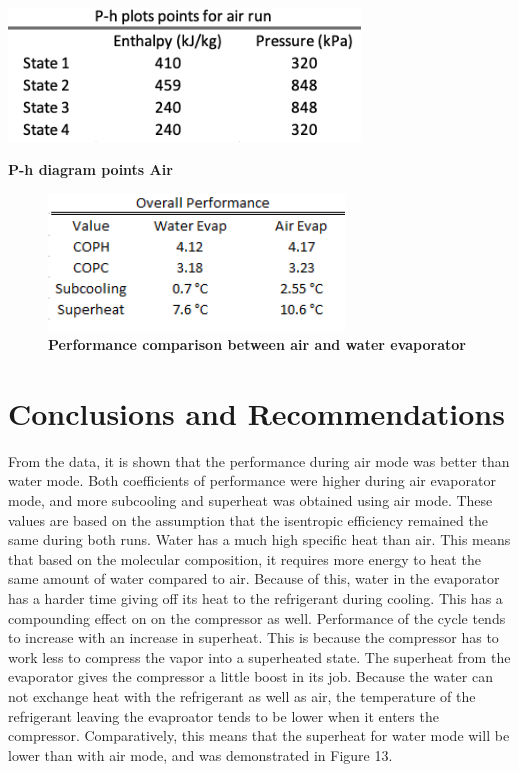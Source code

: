 \documentclass{article}
\begin{document}
\begin{table} [H]
	\centering
	\includegraphics[width=0.7\textwidth]{ph_points_air}
	\caption{\textbf{P-h diagram points Air}}
\end{table}


\begin{figure} [H]
	\centering
	\includegraphics[width=0.7\textwidth]{overall_perform}
	\caption{\textbf{Performance comparison between air and water evaporator}}
\end{figure}

\section {Conclusions and Recommendations}
From the data, it is shown that the performance during air mode was better than water mode. Both coefficients of performance were higher during air evaporator mode, and more subcooling and superheat was obtained using air mode. These values are based on the assumption that the isentropic efficiency remained the same during both runs. Water has a much high specific heat than air. This means that based on the molecular composition, it requires more energy to heat the same amount of water compared to air. Because of this, water in the evaporator has a harder time giving off its heat to the refrigerant during cooling. This has a compounding effect on on the compressor as well. Performance of the cycle tends to increase with an increase in superheat. This is because the compressor has to work less to compress the vapor into a superheated state. The superheat from the evaporator gives the compressor a little boost in its job. Because the water can not exchange heat with the refrigerant as well as air, the temperature of the refrigerant leaving the evaproator tends to be lower when it enters the compressor. Comparatively, this means that the superheat for water mode will be lower than with air mode, and was demonstrated in Figure 13. 
\end{document}
